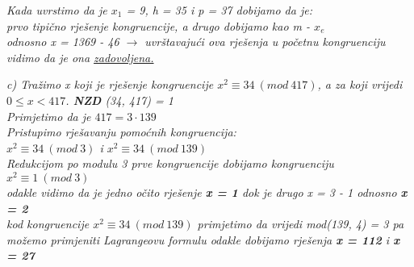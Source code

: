 \documentclass[12pt]{article}
\begin{document}
\begin{enumerate}
\begin{center}
        \textit{Kada uvrstimo da je $x_1$ = 9, h =  35 i p = 37 dobijamo da je:\vspace{0.25cm}\\  prvo tipično rješenje kongruencije, a drugo dobijamo kao m - $x_e$\\ odnosno
        x = 1369 - 46 $\rightarrow$  \vspace{0.25cm} uvrštavajući ova rješenja u početnu kongruenciju vidimo da je ona \underline{zadovoljena.}\\}
        
        \vspace{0.75cm}
        
        
         \textit{c) Tražimo x koji je rješenje kongruencije $x^2 \equiv 34\ (mod\ 417)$, a za koji vrijedi $0 \leq x < 417$. \textbf{NZD} (34, 417) = 1\\ Primjetimo da je $417 = 3 \cdot 139$\\ Pristupimo rješavanju pomoćnih kongruencija: \\ $x^2 \equiv 34 \ (mod\ 3)$ i  $x^2 \equiv 34 \ (mod\ 139)$\\ \vspace{0.25cm} Redukcijom po modulu 3 prve kongruencije dobijamo kongruenciju $x^2 \equiv 1 \ (mod\ 3)$\\odakle vidimo da je jedno očito rješenje \textbf{x = 1} dok je drugo x = 3 - 1 odnosno \textbf{x = 2}\\}
         \vspace{0.25cm}
         \textit{kod kongruencije $x^2 \equiv 34 \ (mod\ 139)$ primjetimo da vrijedi mod(139, 4) = 3 pa možemo primjeniti Lagrangeovu formulu odakle dobijamo rješenja \textbf{x = 112} i \textbf{x = 27}\\}
         \vspace{0.25cm}
         

\end{center}
\end{enumerate}
\end{document}
